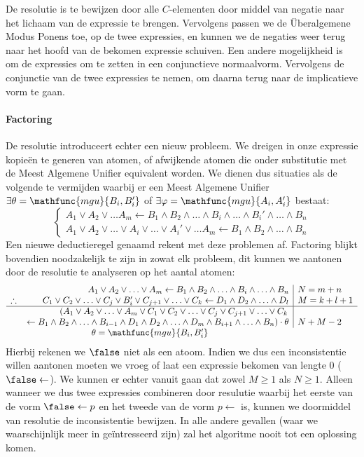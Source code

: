 De resolutie is te bewijzen door alle $C$-elementen door middel van negatie naar het lichaam van de expressie te brengen. Vervolgens passen we de Überalgemene Modus Ponens toe, op de twee expressies, en kunnen we de negaties weer terug naar het hoofd van de bekomen expressie schuiven. Een andere mogelijkheid is om de expressies om te zetten in een conjunctieve normaalvorm. Vervolgens de conjunctie van de twee expressies te nemen, om daarna terug naar de implicatieve vorm te gaan.
\paragraph{Factoring}De resolutie introduceert echter een nieuw probleem. We dreigen in onze expressie kopieën te generen van atomen, of afwijkende atomen die onder substitutie met de Meest Algemene Unifier equivalent worden. We dienen dus situaties als de volgende te vermijden waarbij er een Meest Algemene Unifier $\exists\theta=\mathfunc{mgu}{B_i,B_i'}$ of $\exists\varphi=\mathfunc{mgu}{A_i,A_i'}$ bestaat:
\begin{equation}
\left\{\begin{array}{c}
A_1\vee A_2\vee\ldots A_m\leftarrow B_1\wedge B_2\wedge\ldots\wedge B_i\wedge\ldots\wedge B_i'\wedge\ldots\wedge B_n\\
A_1\vee A_2\vee\ldots\vee A_i\vee\ldots\vee A_i'\vee\ldots A_m\leftarrow B_1\wedge B_2\wedge\ldots\wedge B_n
\end{array}\right.
\label{eqn:factoringProblems}
\end{equation}
Een nieuwe deductieregel genaamd  rekent met deze problemen af. Factoring blijkt bovendien noodzakelijk te zijn in zowat elk probleem, dit kunnen we aantonen door de resolutie te analyseren op het aantal atomen:
\begin{equation}
\begin{array}{lr|l}
&A_1\vee A_2\vee\ldots\vee A_m\leftarrow B_1\wedge B_2\wedge\ldots\wedge B_i\wedge\ldots\wedge B_n&N=m+n\\
\therefore&C_1\vee C_2\vee\ldots\vee C_j\vee B_i'\vee C_{j+1}\vee\ldots\vee C_k\leftarrow D_1\wedge D_2\wedge\ldots\wedge D_l&M=k+l+1\\
\hline
&\left(A_1\vee A_2\vee\ldots\vee A_m\vee C_1\vee C_2\vee\ldots\vee C_j\vee C_{j+1}\vee\ldots\vee C_k\right.\\
&\left.\leftarrow B_1\wedge B_2\wedge\ldots\wedge B_{i-1}\wedge D_1\wedge D_2\wedge\ldots\wedge D_m\wedge B_{i+1}\wedge\ldots\wedge B_n\right)\cdot\theta&N+M-2\\
\multicolumn{2}{c}{\theta=\mathfunc{mgu}{B_i,B_i'}}
\end{array}
\end{equation}
Hierbij rekenen we $\false$ niet als een atoom. Indien we dus een inconsistentie willen aantonen moeten we vroeg of laat een expressie bekomen van lengte 0 ($\false\leftarrow$). We kunnen er echter vanuit gaan dat zowel $M\geq1$ als $N\geq1$. Alleen wanneer we dus twee expressies combineren door resulutie waarbij het eerste van de vorm $\false\leftarrow p$ en het tweede van de vorm $p\leftarrow$ is, kunnen we doormiddel van resolutie de inconsistentie bewijzen. In alle andere gevallen (waar we waarschijnlijk meer in geïntresseerd zijn) zal het algoritme nooit tot een oplossing komen.
